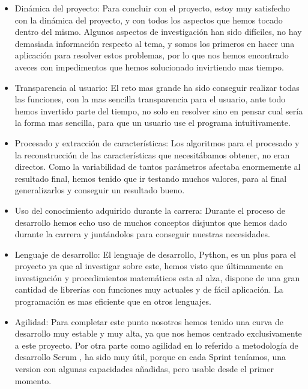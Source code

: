 \begin{itemize}
\item Dinámica del proyecto: Para concluir con el proyecto, estoy muy satisfecho con la dinámica del proyecto, y con todos los aspectos que hemos tocado dentro del mismo.
Algunos aspectos de investigación han sido difíciles, no hay demasiada información respecto al tema, y somos los primeros en hacer una aplicación para resolver estos problemas, por lo que nos hemos encontrado aveces con impedimentos que hemos solucionado invirtiendo mas tiempo.

\item Transparencia al usuario: El reto mas grande ha sido conseguir realizar todas las funciones, con la mas sencilla transparencia para el usuario, ante todo hemos invertido parte del tiempo, no solo en resolver sino en pensar cual sería la forma mas sencilla, para que un usuario use el programa intuitivamente. 
\item Procesado y extracción de características: Los algoritmos para el procesado y la reconstrucción de las características que necesitábamos obtener, no eran directos. Como la variabilidad de tantos parámetros afectaba enormemente al resultado final, hemos tenido que ir testando muchos valores, para al final generalizarlos y conseguir un resultado bueno.

\item Uso del conocimiento adquirido durante la carrera: Durante el proceso de desarrollo hemos echo uso de muchos conceptos disjuntos que hemos dado durante la carrera y juntándolos para conseguir nuestras necesidades.

\item Lenguaje de desarrollo: El lenguaje de desarrollo, Python, es un plus para el proyecto ya que al investigar sobre este, hemos visto que últimamente en investigación y procedimientos matemáticos esta al alza, dispone de una gran cantidad de librerías con funciones muy actuales y de fácil aplicación. La programación es mas eficiente que en otros lenguajes.

\item Agilidad: Para completar este punto nosotros hemos tenido una curva de desarrollo muy estable y muy alta, ya que nos hemos centrado exclusivamente a este proyecto.
Por otra parte como agilidad en lo referido a metodología de desarrollo Scrum \cite{Scrum}, ha sido muy útil, porque en cada Sprint teníamos, una version con algunas capacidades añadidas, pero usable desde el primer momento.


\end{itemize}
